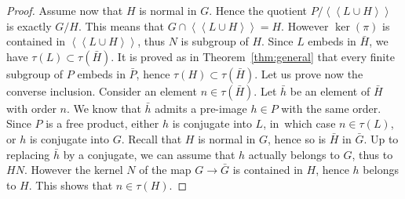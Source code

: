 \documentclass[JEP,XML,SOM,Unicode]{cedram}
\theoremstyle{definition}
\newcommand{\normal}[1]{\left<\! \left< #1\right> \!\right>}
\begin{document}
\begin{proof}
Assume now that $H$ is normal in $G$.
Hence the quotient $P / \normal{ L \cup H}$ is exactly $G/H$.
This means that $G \cap \normal{L \cup H} = H$.
However $\ker(\pi)$ is contained in $\normal{L \cup H}$, thus $N$ is subgroup of $H$.
Since $L$ embeds in $\bar H$, we have $\tau(L) \subset \tau(\bar H)$.
It is proved as in Theorem~\ref{thm:general} that every finite subgroup of $P$ embeds in $\bar{P}$, hence $\tau(H) \subset \tau(\bar H)$.
Let us prove now the converse inclusion.
Consider an element $n \in \tau(\bar H)$.
Let $\bar h$ be an element of $\bar H$ with order $n$.
We know that $\bar h$ admits a pre-image $h \in P$ with the same order.
Since $P$ is a free product, either $h$ is conjugate into $L$, in~which case $n \in \tau(L)$, or $h$ is conjugate into $G$.
Recall that $H$ is normal in $G$, hence so is $\bar H$ in $\bar G$.
Up to replacing $\bar h$ by a conjugate, we can assume that $h$ actually belongs to $G$, thus to $HN$.
However the kernel $N$ of the map $G\to \bar G$ is contained in $H$, hence $h$ belongs to $H$.
This shows that $n \in \tau(H)$.
\end{proof}
\end{document}
